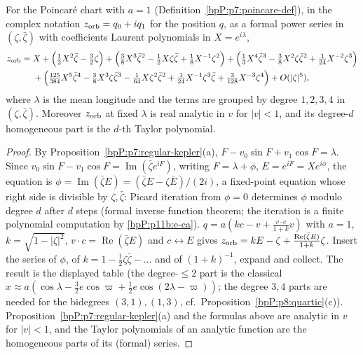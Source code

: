 \begin{lemma}\label{bpP:p11b:orbit}
For the Poincar\'e chart with $a=1$ (Definition~\ref{bpP:p7:poincare-def}), in the complex notation $z_{\rm orb}=q_0+iq_1$ for the position $q$, as a formal power series in $(\zeta,\bar\zeta)$ with coefficients Laurent polynomials in $X=e^{i\lambda}$,
\begin{align*}
z_{\rm orb}={}&X+\Big(\tfrac12X^2\bar\zeta-\tfrac32\zeta\Big)+\Big(\tfrac38X^3\bar\zeta^2-\tfrac12X\zeta\bar\zeta+\tfrac18X^{-1}\zeta^2\Big)
+\Big(\tfrac13X^4\bar\zeta^3-\tfrac38X^2\zeta\bar\zeta^2+\tfrac1{24}X^{-2}\zeta^3\Big)\\
&+\Big(\tfrac{125}{384}X^5\bar\zeta^4-\tfrac38X^3\zeta\bar\zeta^3-\tfrac1{64}X\zeta^2\bar\zeta^2+\tfrac1{24}X^{-1}\zeta^3\bar\zeta+\tfrac3{128}X^{-3}\zeta^4\Big)+O(|\zeta|^5),
\end{align*}
where $\lambda$ is the mean longitude and the terms are grouped by degree $1,2,3,4$ in $(\zeta,\bar\zeta)$. Moreover $z_{\rm orb}$ at fixed $\lambda$ is real analytic in $v$ for $|v|<1$, and its degree-$d$ homogeneous part is the $d$-th Taylor polynomial.
\end{lemma}
\begin{proof}
\label{stepP:p11b:or-kep} By Proposition~\ref{bpP:p7:regular-kepler}(a), $F-v_0\sin F+v_1\cos F=\lambda$. Since $v_0\sin F-v_1\cos F=\operatorname{Im}(\bar\zeta e^{iF})$, writing $F=\lambda+\phi$, $E=e^{iF}=Xe^{i\phi}$, the equation is $\phi=\operatorname{Im}(\bar\zeta E)=(\bar\zeta E-\zeta\bar E)/(2i)$, a fixed-point equation whose right side is divisible by $\zeta,\bar\zeta$: Picard iteration from $\phi=0$ determines $\phi$ modulo degree $d$ after $d$ steps (formal inverse function theorem; the iteration is a finite polynomial computation by \ref{bpP:p11b:e-ca}).
\label{stepP:p11b:or-pos} $q=a(kc-v+\frac{v\cdot c}{1+k}v)$ with $a=1$, $k=\sqrt{1-|\zeta|^2}$, $v\cdot c=\operatorname{Re}(\bar\zeta E)$ and $c\leftrightarrow E$ gives $z_{\rm orb}=kE-\zeta+\frac{\operatorname{Re}(\bar\zeta E)}{1+k}\zeta$. Insert the series of $\phi$, of $k=1-\tfrac12\zeta\bar\zeta-\dots$ and of $(1+k)^{-1}$, expand and collect. The result is the displayed table (the degree-$\le2$ part is the classical $x\approx a(\cos\lambda-\frac32e\cos\varpi+\frac12e\cos(2\lambda-\varpi))$; the degree $3,4$ parts are needed for the bidegrees $(3,1),(1,3)$, cf.\ Proposition~\ref{bpP:p8:quartic}(c)).
\label{stepP:p11b:or-an} Proposition~\ref{bpP:p7:regular-kepler}(a) and the formulas above are analytic in $v$ for $|v|<1$, and the Taylor polynomials of an analytic function are the homogeneous parts of its (formal) series.
\end{proof}

